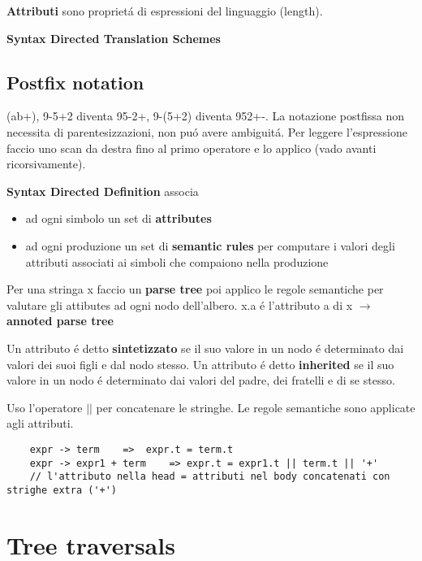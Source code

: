 \textbf{Attributi} sono propriet\'a di espressioni del linguaggio (length).

\textbf{Syntax Directed Translation Schemes} 

\subsection{Postfix notation} 
(ab+), 9-5+2 diventa 95-2+, 9-(5+2) diventa 952+-. La notazione postfissa non necessita di parentesizzazioni, non pu\'o avere ambiguit\'a.
Per leggere l'espressione faccio uno scan da destra fino al primo operatore e lo applico (vado avanti ricorsivamente).

\textbf{Syntax Directed Definition} associa 
\begin{itemize}
    \item ad ogni simbolo un set di \textbf{attributes}\\
    \item ad ogni produzione un set di \textbf{semantic rules} per computare i valori degli attributi associati ai simboli che 
        compaiono nella produzione\\
\end{itemize}

Per una stringa x faccio un \textbf{parse tree} poi applico le regole semantiche per valutare gli attibutes ad ogni nodo dell'albero.
x.a \'e l'attributo a di x $\rightarrow$ \textbf{annoted parse tree}


Un attributo \'e detto \textbf{sintetizzato} se il suo valore in un nodo \'e determinato dai valori dei suoi figli e dal nodo stesso.
Un attributo \'e detto \textbf{inherited} se il suo valore in un nodo \'e determinato dai valori del padre, dei fratelli e di se stesso.


Uso l'operatore $||$ per concatenare le stringhe. Le regole semantiche sono applicate agli attributi.

\begin{lstlisting}
    expr -> term    =>  expr.t = term.t 
    expr -> expr1 + term    => expr.t = expr1.t || term.t || '+'
    // l'attributo nella head = attributi nel body concatenati con strighe extra ('+')
\end{lstlisting}

\section{Tree traversals}
